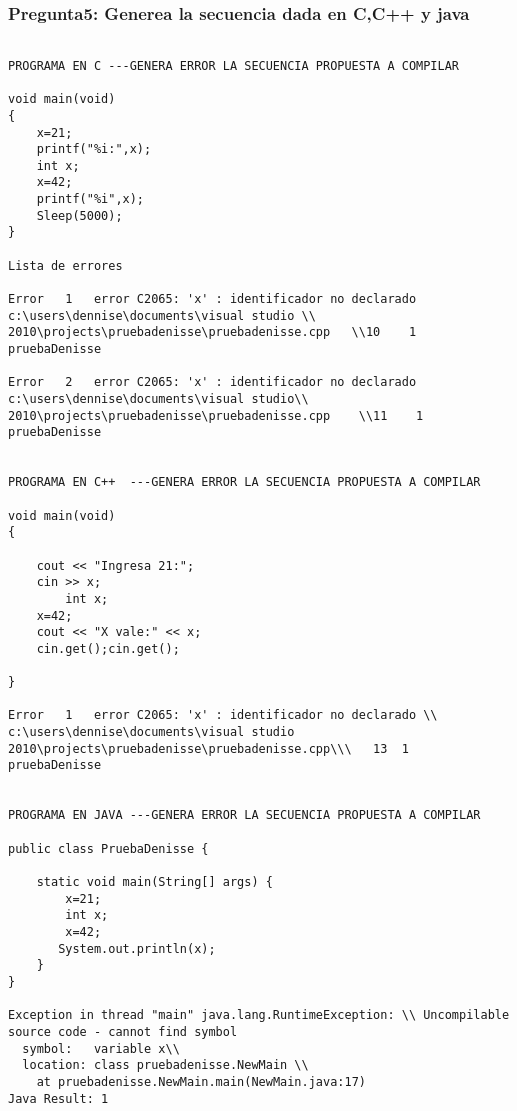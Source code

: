 \subsubsection{Pregunta5: Generea la secuencia dada en C,C++ y java}

\begin{verbatim}

PROGRAMA EN C ---GENERA ERROR LA SECUENCIA PROPUESTA A COMPILAR

void main(void)
{
	x=21;
	printf("%i:",x);
	int x;
	x=42;
	printf("%i",x);
	Sleep(5000);
}

Lista de errores

Error	1	error C2065: 'x' : identificador no declarado	c:\users\dennise\documents\visual studio \\ 2010\projects\pruebadenisse\pruebadenisse.cpp	\\10	1	pruebaDenisse

Error	2	error C2065: 'x' : identificador no declarado	c:\users\dennise\documents\visual studio\\ 2010\projects\pruebadenisse\pruebadenisse.cpp	\\11	1	pruebaDenisse


PROGRAMA EN C++  ---GENERA ERROR LA SECUENCIA PROPUESTA A COMPILAR

void main(void)
{
	
	cout << "Ingresa 21:";
	cin >> x;
        int x;
	x=42;
	cout << "X vale:" << x;
	cin.get();cin.get();
	
}

Error	1	error C2065: 'x' : identificador no declarado \\	c:\users\dennise\documents\visual studio 2010\projects\pruebadenisse\pruebadenisse.cpp\\\	13	1	pruebaDenisse


PROGRAMA EN JAVA ---GENERA ERROR LA SECUENCIA PROPUESTA A COMPILAR

public class PruebaDenisse {

    static void main(String[] args) {
        x=21;
        int x;
        x=42;
       System.out.println(x);
    }
}

Exception in thread "main" java.lang.RuntimeException: \\ Uncompilable source code - cannot find symbol
  symbol:   variable x\\
  location: class pruebadenisse.NewMain \\
	at pruebadenisse.NewMain.main(NewMain.java:17)
Java Result: 1


\end{verbatim}